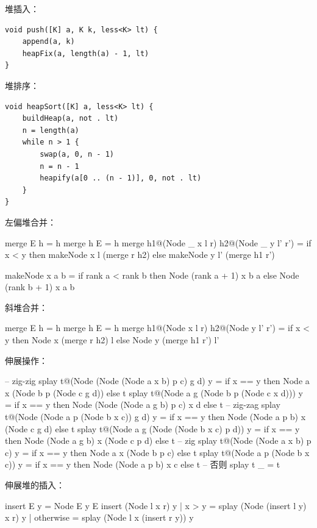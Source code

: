 \documentclass[b5paper]{ctexart}
\begin{document}
堆插入：

\begin{lstlisting}[language = Bourbaki]
void push([K] a, K k, less<K> lt) {
    append(a, k)
    heapFix(a, length(a) - 1, lt)
}
\end{lstlisting}

堆排序：

\begin{lstlisting}[language = Bourbaki]
void heapSort([K] a, less<K> lt) {
    buildHeap(a, not . lt)
    n = length(a)
    while n > 1 {
        swap(a, 0, n - 1)
        n = n - 1
        heapify(a[0 .. (n - 1)], 0, not . lt)
    }
}
\end{lstlisting}

左偏堆合并：

\begin{Haskell}
merge E h = h
merge h E = h
merge h1@(Node _ x l r) h2@(Node _ y l' r') =
    if x < y then makeNode x l (merge r h2)
    else makeNode y l' (merge h1 r')

makeNode x a b = if rank a < rank b then Node (rank a + 1) x b a
                 else Node (rank b + 1) x a b
\end{Haskell}

斜堆合并：

\begin{Haskell}
merge E h = h
merge h E = h
merge h1@(Node x l r) h2@(Node y l' r') =
    if x < y then Node x (merge r h2) l
    else Node y (merge h1 r') l'
\end{Haskell}

伸展操作：

\begin{Haskell}
-- zig-zig
splay t@(Node (Node (Node a x b) p c) g d) y =
    if x == y then Node a x (Node b p (Node c g d)) else t
splay t@(Node a g (Node b p (Node c x d))) y =
    if x == y then Node (Node (Node a g b) p c) x d else t
-- zig-zag
splay t@(Node (Node a p (Node b x c)) g d) y =
    if x == y then Node (Node a p b) x (Node c g d) else t
splay t@(Node a g (Node (Node b x c) p d)) y =
    if x == y then Node (Node a g b) x (Node c p d) else t
-- zig
splay t@(Node (Node a x b) p c) y = if x == y then Node a x (Node b p c) else t
splay t@(Node a p (Node b x c)) y = if x == y then Node (Node a p b) x c else t
-- 否则
splay t _ = t
\end{Haskell}

伸展堆的插入：

\begin{Haskell}
insert E y = Node E y E
insert (Node l x r) y
    | x > y     = splay (Node (insert l y) x r) y
    | otherwise = splay (Node l x (insert r y)) y
\end{Haskell}
\end{document}
